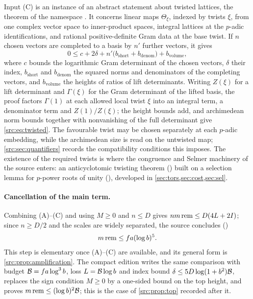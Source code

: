 Input (C) is an instance of an abstract statement about twisted lattices, the theorem
 of the namespace . It concerns
linear maps $\Theta_\xi$,
indexed by twists $\xi$, from one complex vector space to inner-product spaces, integral
lattices at the $p$-adic identifications, and rational positive-definite Gram data at the base
twist. If $n$ chosen vectors are completed to a basis by $n'$ further vectors, it gives
\begin{equation}\label{src:eq:twisted}
0\le c+2\delta+n'\bigl(b_{\mathrm{short}}+b_{\mathrm{denom}}\bigr)+b_{\mathrm{volume}},
\end{equation}
where $c$ bounds the logarithmic Gram determinant of the chosen vectors, $\delta$ their index,
$b_{\mathrm{short}}$ and $b_{\mathrm{denom}}$ the squared norms and denominators of the
completing vectors, and $b_{\mathrm{volume}}$ the heights of ratios of lift determinants.
Writing $Z(\xi)$ for a lift determinant and $\Gamma(\xi)$ for the Gram determinant of the
lifted basis, the proof factors $\Gamma(1)$ at each allowed local twist $\xi$ into an integral
term, a denominator term and $Z(1)/Z(\xi)$; the height bounds add, and archimedean norm bounds
together with nonvanishing of the full determinant give \eqref{src:eq:twisted}. The favourable
twist may be chosen separately at each $p$-adic embedding, while the archimedean size is read
on the untwisted map; \cref{src:sec:quantifiers} records the compatibility conditions this
imposes. The existence of the required twists is where the congruence and Selmer machinery
of the source enters: an anticyclotomic twisting theorem
() built on a selection lemma for $p$-power
roots of unity (), developed in \cref{sec:tors,sec:cost,sec:sel}.

\paragraph{Cancellation of the main term.}
Combining (A)--(C) and using $M\ge0$ and $n\le D$ gives $nm\,\mathrm{rem}\le D(4L+2I)$; since
$n\ge D/2$ and the scales are widely separated, the source concludes
()
\begin{equation}\label{src:eq:star}
m\,\mathrm{rem}\le fa(\log b)^5 .
\end{equation}
This step is elementary once (A)--(C) are available, and its general form is
\cref{src:prop:amplification}. The compact edition writes the same comparison with budget
$\mathcal{B}=fa\log^3b$, loss $L=\mathcal{B}\log b$ and index bound $\delta\le5D\log(1+b^2)\mathcal{B}$, replaces
the sign condition $M\ge0$ by a one-sided bound on the top height, and proves
$m\,\mathrm{rem}\le(\log b)^2\mathcal{B}$; this is the case of \cref{src:prop:top} recorded after it.


